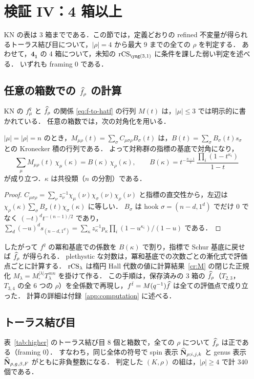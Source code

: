 \section{検証 IV：4 箱以上}\label{sec:higher}

KN の表は 3 箱までである．この節では，定義どおりの refined 不変量が得られるトーラス結び目について，$|\rho|=4$ から最大 $9$ までの全ての $\rho$ を判定する．
あわせて，$\mathbf{4_1}$ の 4 箱について，未知の $\rCS_{\yng(3,1)}$ に条件を課した弱い判定を述べる．
いずれも framing 0 である．

\subsection{\texorpdfstring{任意の箱数での $\widehat{f}_\rho$ の計算}{任意の箱数での hat f の計算}}
KN の $f^q_\mu$ と $\widehat{f}_\rho$ の関係 \eqref{eq:f-to-hatf} の行列 $M(t)$ は，$|\mu|\le3$ では明示的に書かれている．
任意の箱数では，次の対角化を用いる．
\begin{lemma}\label{lem:M-diag}
$|\mu|=|\rho|=n$ のとき，$M_{\mu\rho}(t)=\sum_\sigma C_{\mu\sigma\rho}B_\sigma(t)$ は，$B(t)=\sum_\sigma B_\sigma(t)s_\sigma$ との Kronecker 積の行列である．
よって対称群の指標の基底で対角になり，
\[
\sum_\mu M_{\mu\rho}(t)\,\chi_\mu(\kappa)=B(\kappa)\,\chi_\rho(\kappa),\qquad
B(\kappa)=t^{-\frac{n-1}2}\,\frac{\prod_i(1-t^{\kappa_i})}{1-t}
\]
が成り立つ．$\kappa$ は共役類（$n$ の分割）である．
\end{lemma}
\begin{proof}
$C_{\mu\sigma\rho}=\sum_\nu z_\nu^{-1}\chi_\mu(\nu)\chi_\sigma(\nu)\chi_\rho(\nu)$ と指標の直交性から，左辺は $\chi_\rho(\kappa)\sum_\sigma B_\sigma(t)\chi_\sigma(\kappa)$ に等しい．
$B_\sigma$ は hook $\sigma=(n-d,1^d)$ でだけ 0 でなく $(-t)^d t^{-(n-1)/2}$ であり，
$\sum_{d}(-u)^d s_{(n-d,1^d)}=\sum_\kappa z_\kappa^{-1}p_\kappa\prod_i(1-u^{\kappa_i})/(1-u)$ である．
\end{proof}
したがって $f^q$ の冪和基底での係数を $B(\kappa)$ で割り，指標で Schur 基底に戻せば $\widehat{f}_\rho$ が得られる．
plethystic な対数は，冪和基底での次数ごとの漸化式で評価点ごとに計算する．
$\textrm{rCS}_\lambda$ は楕円 Hall 代数の値に計算結果~\ref{cr:M} の閉じた正規化 $M_\lambda=M_\square^{|\lambda|}T_\lambda^{mn}$ を掛けて作る．
この手順は，保存済みの 3 箱の $\widehat{f}_\rho$（$T_{2,3}$，$T_{3,4}$ の全 6 つの $\rho$）を全係数で再現し，$f^{\bar t}=M(q^{-1})\widehat{f}$ は全ての評価点で成り立った．
計算の詳細は付録~\ref{app:computation} に述べる．

\subsection{トーラス結び目}
\begin{compresult}\label{cr:higher}
表~\ref{tab:higher} のトーラス結び目 8 個と箱数で，全ての $\rho$ について $\widehat{f}_\rho$ は正である（framing 0）．
すなわち，同じ全体の符号で spin 表示 $\widehat{\mathbf{N}}_{\rho;i,j,k}$ と genus 表示 $\widehat{\mathbf{N}}_{\rho,g,\beta,F}$ がともに非負整数になる．
判定した $(K,\rho)$ の組は，$|\rho|\ge4$ で計 340 個である．
\end{compresult}

